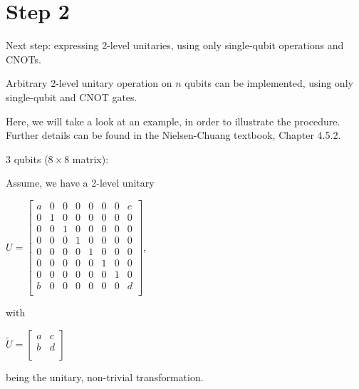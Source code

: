 \section{Step 2}
{Next step: expressing 2-level unitaries, using only single-qubit operations and CNOTs. \\
\begin{claim}
    Arbitrary 2-level unitary operation on $n$ qubits can be implemented, using only single-qubit and CNOT gates.
\end{claim} 
Here, we will take a look at an example, in order to illustrate the procedure. Further details can be found in the Nielsen-Chuang textbook, Chapter 4.5.2. \\
\begin{example}
    3 qubits ($8 \times 8$ matrix):
\end{example}
Assume, we have a 2-level unitary 
\begin{center}
   $U = 
\begin{bmatrix}
 a & 0 & 0 & 0 & 0 & 0 & 0 & c \\
 0 & 1 & 0 & 0 & 0 & 0 & 0 & 0 \\    
 0 & 0 & 1 & 0 & 0 & 0 & 0 & 0 \\
 0 & 0 & 0 & 1 & 0 & 0 & 0 & 0 \\
 0 & 0 & 0 & 0 & 1 & 0 & 0 & 0 \\
 0 & 0 & 0 & 0 & 0 & 1 & 0 & 0 \\
 0 & 0 & 0 & 0 & 0 & 0 & 1 & 0 \\
 b & 0 & 0 & 0 & 0 & 0 & 0 & d \\
\end{bmatrix}$,  
\end{center}
with 
\begin{center}
    $\tilde{U} = 
\begin{bmatrix}
 a  &  c  \\
 b  &  d  \\
\end{bmatrix}$
\end{center}
being the unitary, non-trivial transformation. \\

}
